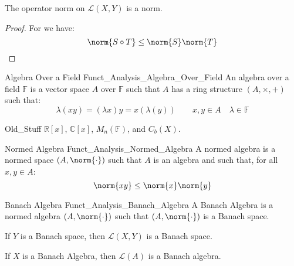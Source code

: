     \begin{theorem}
        The operator norm on $\mathscr{L}(X,Y)$ is a norm.
    \end{theorem}
    \begin{proof}
        For we have:
        \begin{equation}
            \norm{S\circ{T}}\leq\norm{S}\norm{T}
        \end{equation}
    \end{proof}
    \begin{ldefinition}{Algebra Over a Field}
          {Funct_Analysis_Algebra_Over_Field}
        An algebra over a field $\mathbb{F}$ is a vector
        space $A$ over $\mathbb{F}$ such that $A$ has a ring
        structure $(A,\times,+)$ such that:
        \begin{equation}
            \lambda(xy)=(\lambda{x})y
            =x(\lambda(y))
            \quad\quad
            x,y\in{A}
            \quad\lambda\in\mathbb{F}
        \end{equation}
    \end{ldefinition}
    \begin{lexample}{}{Old_Stuff}
        $\mathbb{R}[x]$, $\mathbb{C}[x]$, $M_{n}(\mathbb{F})$,
        and $C_{b}(X)$.
    \end{lexample}
    \begin{ldefinition}{Normed Algebra}
          {Funct_Analysis_Normed_Algebra}
        A normed algebra is a normed space $(A,\norm{\cdot})$
        such that $A$ is an algebra and such that,
        for all $x,y\in{A}$:
        \begin{equation}
            \norm{xy}\leq\norm{x}\norm{y}
        \end{equation}
    \end{ldefinition}
    \begin{ldefinition}{Banach Algebra}
          {Funct_Analysis_Banach_Algebra}
        A Banach Algebra is a normed algebra $(A,\norm{\cdot})$
        such that $(A,\norm{\cdot})$ is a Banach space.
    \end{ldefinition}
    \begin{theorem}
        If $Y$ is a Banach space, then $\mathscr{L}(X,Y)$
        is a Banach space.
    \end{theorem}
    \begin{theorem}
        If $X$ is a Banach Algebra, then
        $\mathscr{L}(A)$ is a Banach algebra.
    \end{theorem}

